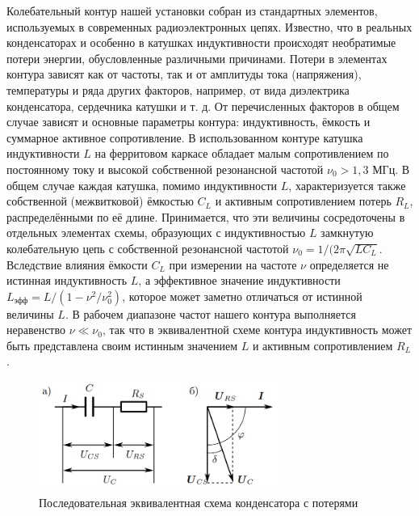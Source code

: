 \documentclass[a4paper,12pt]{article} %
\begin{document}
Колебательный контур нашей установки собран из стандартных элементов, используемых в современных радиоэлектронных цепях. Известно, что в реальных конденсаторах и особенно в катушках индуктивности происходят необратимые потери энергии, обусловленные различными причинами. Потери в элементах контура зависят как от частоты, так и от амплитуды тока (напряжения), температуры и ряда других факторов, например, от вида диэлектрика конденсатора, сердечника катушки и т. д. От
перечисленных факторов в общем случае зависят и основные параметры
контура: индуктивность, ёмкость и суммарное активное сопротивление.
В использованном контуре катушка индуктивности $L$ на ферритовом каркасе
обладает малым сопротивлением по постоянному току и высокой собственной резонансной частотой $\nu_0 > 1,3$ МГц. В общем случае каждая катушка, помимо индуктивности $L$, характеризуется также собственной (межвитковой) ёмкостью $C_L$ и активным сопротивлением потерь $R_L$, распределёнными по её длине. Принимается, что эти величины сосредоточены в отдельных элементах схемы, образующих с индуктивностью $L$
замкнутую колебательную цепь с собственной резонансной частотой $\nu_0 = 1/(2\pi\sqrt{LC_L}$. Вследствие влияния ёмкости $C_L$ при измерении на
частоте $\nu$ определяется не истинная индуктивность $L$, а эффективное
значение индуктивности $L_\text{эфф} = L/(1 - \nu^2/\nu_0^2)$, которое может заметно
отличаться от истинной величины $L$. В рабочем диапазоне частот нашего контура выполняется неравенство $\nu \ll \nu_0$, так что в эквивалентной
схеме контура индуктивность может быть представлена своим истинным
значением $L$ и активным сопротивлением $R_L$.

\begin{figure}[h]
    \centering
    \includegraphics[width=0.7\textwidth]{eqCircuit.png}
    \caption{Последовательная эквивалентная схема конденсатора с потерями}
    \label{fig:eqCircuit}
\end{figure}
\end{document}
